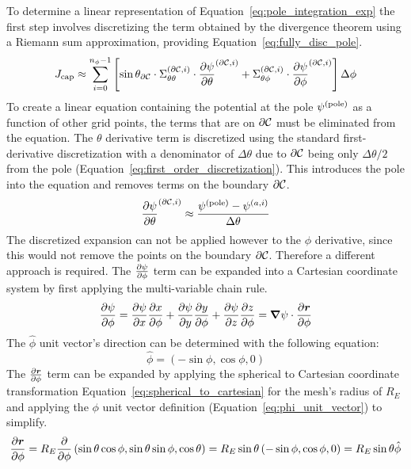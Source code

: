 To determine a linear representation of Equation~\ref{eq:pole_integration_exp} the first step involves discretizing the term obtained by the divergence theorem using a Riemann sum approximation, providing Equation~\ref{eq:fully_disc_pole}.
\begin{equation}
	J_{\rm cap} \approx\sum_{i=0}^{n_{\phi}-1}
	\left[
		\sin\theta_{\partial\mathcal{C}} \cdot \Sigma_{\theta\theta}^ {(\partial\mathcal{C},i)}\cdot\frac{\partial \psi}{\partial \theta}^{(\partial\mathcal{C},i)}+
		\Sigma_{\theta\phi}^{(\partial\mathcal{C},i)}\cdot\frac{\partial\psi}{\partial\phi}^{(\partial\mathcal{C},i)}
		\right] \Delta\phi
	\label{eq:fully_disc_pole}
\end{equation}
To create a linear equation containing the potential at the pole $\psi^{(\rm pole)}$ as a function of other grid points, the terms that are on $\partial\mathcal{C}$ must be eliminated from the equation. The $\theta$ derivative term is discretized using the standard first-derivative discretization with a denominator of $\Delta\theta$ due to $\partial\mathcal{C}$ being only $\Delta\theta/2$ from the pole (Equation~\ref{eq:first_order_discretization}). This introduces the pole into the equation and removes terms on the boundary $\partial\mathcal{C}$.
\begin{equation}
	\frac{\partial \psi}{\partial \theta}^{(\partial\mathcal{C},i)}
	\approx \frac{\psi^{(\rm pole)} - \psi^{(a, i)}}{\Delta \theta}
\end{equation}
The discretized expansion can not be applied however to the $\phi$ derivative, since this would not remove the points on the boundary $\partial\mathcal{C}$. Therefore a different approach is required. The $\pdv{\psi}{\phi}$ term can be expanded into a Cartesian coordinate system by first applying the multi-variable chain rule.
\begin{equation*}
	\pdv{\psi}{\phi} =
	\pdv{\psi}{x}\pdv{x}{\phi}
	+ \pdv{\psi}{y}\pdv{y}{\phi}
	+\pdv{\psi}{z}\pdv{z}{\phi} = \bm\nabla \psi \cdot \pdv{\bm r}{\phi}
\end{equation*}
The $\hat\phi$ unit vector's direction can be determined with the following equation:
\begin{equation}
	\hat\phi = \left(-\sin\phi, \cos\phi, 0\right)
	\label{eq:phi_unit_vector}
\end{equation}
The $\pdv{\bm r}{\phi}$ term can be expanded by applying the spherical to Cartesian coordinate transformation Equation~\ref{eq:spherical_to_cartesian} for the mesh's radius of $R_E$ and applying the $\phi$ unit vector definition (Equation~\ref{eq:phi_unit_vector}) to simplify.
\begin{equation*}
	\pdv{\bm r}{\phi} = R_E\pdv{\phi} \left( \sin\theta\cos\phi, \sin\theta\sin\phi, \cos\theta\right) = R_E\sin\theta\left( -\sin\phi, \cos\phi,0 \right) = R_E\sin\theta\hat\phi
\end{equation*}
